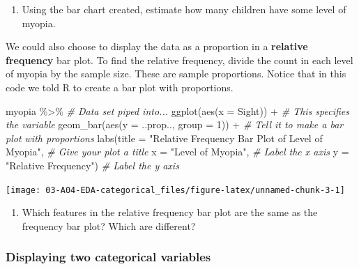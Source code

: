 \documentclass[
]{report}
\newenvironment{Shaded}{\begin{snugshade}}{\end{snugshade}}
\newcommand{\AttributeTok}[1]{\textcolor[rgb]{0.77,0.63,0.00}{#1}}
\newcommand{\CommentTok}[1]{\textcolor[rgb]{0.56,0.35,0.01}{\textit{#1}}}
\newcommand{\DecValTok}[1]{\textcolor[rgb]{0.00,0.00,0.81}{#1}}
\newcommand{\FunctionTok}[1]{\textcolor[rgb]{0.00,0.00,0.00}{#1}}
\newcommand{\NormalTok}[1]{#1}
\newcommand{\SpecialCharTok}[1]{\textcolor[rgb]{0.00,0.00,0.00}{#1}}
\newcommand{\StringTok}[1]{\textcolor[rgb]{0.31,0.60,0.02}{#1}}
\providecommand{\tightlist}{%
  \setlength{\itemsep}{0pt}\setlength{\parskip}{0pt}}
\begin{document}
\begin{enumerate}
\def\labelenumi{\arabic{enumi}.}
\setcounter{enumi}{3}
\tightlist
\item
  Using the bar chart created, estimate how many children have some level of myopia.
\end{enumerate}

\vspace{0.2in}

We could also choose to display the data as a proportion in a \textbf{relative frequency} bar plot. To find the relative frequency, divide the count in each level of myopia by the sample size. These are sample proportions. Notice that in this code we told R to create a bar plot with proportions.

\begin{Shaded}
\begin{Highlighting}[]
\NormalTok{myopia }\SpecialCharTok{\%\textgreater{}\%} \CommentTok{\# Data set piped into...}
\FunctionTok{ggplot}\NormalTok{(}\FunctionTok{aes}\NormalTok{(}\AttributeTok{x =}\NormalTok{ Sight)) }\SpecialCharTok{+}   \CommentTok{\# This specifies the variable}
  \FunctionTok{geom\_bar}\NormalTok{(}\FunctionTok{aes}\NormalTok{(}\AttributeTok{y =}\NormalTok{ ..prop.., }\AttributeTok{group =} \DecValTok{1}\NormalTok{)) }\SpecialCharTok{+}  \CommentTok{\# Tell it to make a bar plot with proportions}
  \FunctionTok{labs}\NormalTok{(}\AttributeTok{title =} \StringTok{"Relative Frequency Bar Plot of Level of Myopia"}\NormalTok{,  }\CommentTok{\# Give your plot a title}
       \AttributeTok{x =} \StringTok{"Level of Myopia"}\NormalTok{,   }\CommentTok{\# Label the x axis}
       \AttributeTok{y =} \StringTok{"Relative Frequency"}\NormalTok{)  }\CommentTok{\# Label the y axis}
\end{Highlighting}
\end{Shaded}

\begin{center}\texttt{[image: 03-A04-EDA-categorical\_files/figure-latex/unnamed-chunk-3-1]} \end{center}

\begin{enumerate}
\def\labelenumi{\arabic{enumi}.}
\setcounter{enumi}{4}
\tightlist
\item
  Which features in the relative frequency bar plot are the same as the frequency bar plot? Which are different?
\end{enumerate}

\newpage

\hypertarget{displaying-two-categorical-variables}{%
\subsubsection*{Displaying two categorical variables}\label{displaying-two-categorical-variables}}
\end{document}
